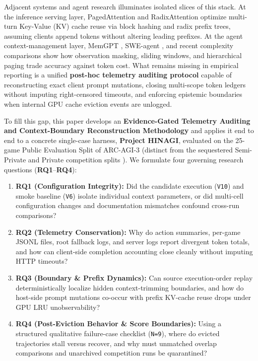 \documentclass[10pt]{article}
\newcommand{\code}[1]{\texttt{#1}}
\begin{document}
Adjacent systems and agent research illuminates isolated slices of this stack. At the inference serving layer, PagedAttention \citep{kwon2023pagedattention} and RadixAttention \citep{zheng2024sglang} optimize multi-turn Key-Value (KV) cache reuse via block hashing and radix prefix trees, assuming clients append tokens without altering leading prefixes. At the agent context-management layer, MemGPT \citep{packer2023memgpt}, SWE-agent \citep{yang2024sweagent}, and recent complexity comparisons \citep{lindenbauer2025complexity} show how observation masking, sliding windows, and hierarchical paging trade accuracy against token cost. What remains missing in empirical reporting is a unified \textbf{post-hoc telemetry auditing protocol} capable of reconstructing exact client prompt mutations, closing multi-scope token ledgers without imputing right-censored timeouts, and enforcing epistemic boundaries when internal GPU cache eviction events are unlogged.

To fill this gap, this paper develops an \textbf{Evidence-Gated Telemetry Auditing and Context-Boundary Reconstruction Methodology} and applies it end to end to a concrete single-case harness, \textbf{Project HINAGI}, evaluated on the 25-game Public Evaluation Split of ARC-AGI-3 (distinct from the sequestered Semi-Private and Private competition splits \citep{chollet2026arc3}). We formulate four governing research questions (\textbf{RQ1}--\textbf{RQ4}):
\begin{enumerate}[leftmargin=1.4em,itemsep=2pt]
\item \textbf{RQ1 (Configuration Integrity):} Did the candidate execution (\code{V10}) and smoke baseline (\code{V6}) isolate individual context parameters, or did multi-cell configuration changes and documentation mismatches confound cross-run comparisons?
\item \textbf{RQ2 (Telemetry Conservation):} Why do action summaries, per-game JSONL files, root fallback logs, and server logs report divergent token totals, and how can client-side completion accounting close cleanly without imputing HTTP timeouts?
\item \textbf{RQ3 (Boundary \& Prefix Dynamics):} Can source execution-order replay deterministically localize hidden context-trimming boundaries, and how do host-side prompt mutations co-occur with prefix KV-cache reuse drops under GPU LRU unobservability?
\item \textbf{RQ4 (Post-Eviction Behavior \& Score Boundaries):} Using a structured qualitative failure-case checklist (\code{N=9}), where do evicted trajectories stall versus recover, and why must unmatched overlap comparisons and unarchived competition runs be quarantined?
\end{enumerate}
\end{document}
